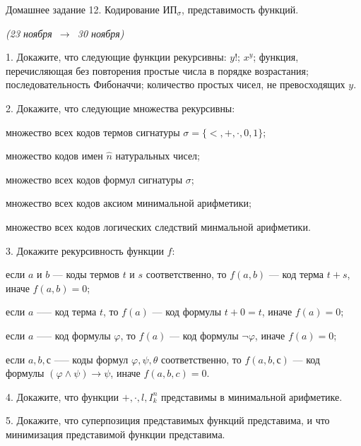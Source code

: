 \documentclass[a4paper,11pt]{article}
\begin{document}
   \newcommand{\enumsep}{\vspace{-2.8mm}
   		\begin{enumerate}[itemsep=0.4mm,leftmargin=2.5mm]}

\begin{center}
	{\Large Домашнее задание 12. Кодирование \(\text{ИП}_{\sigma}\), представимость функций.}

	{\it (23 ноября\ \(\to\)\ 30 ноября)}
\end{center}

1. Докажите, что следующие функции рекурсивны: $y!$; $x^y$; функция, перечисляющая без повторения простые числа в порядке возрастания; последовательность Фибоначчи; количество простых чисел, не превосходящих $y$. 
\medskip

2. Докажите, что следующие множества рекурсивны: 

множество всех кодов термов сигнатуры $\sigma=\{<,+,\cdot,0,1\}$; 

множество кодов имен $\hat{n}$ натуральных чисел; 

множество всех кодов формул сигнатуры $\sigma$;

множество всех кодов аксиом минимальной арифметики;

множество всех кодов логических следствий минмальной арифметики. 
\medskip

3. Докажите рекурсивность функции $f$:

 если $a$ и $b$ — коды термов $t$ и $s$ соответственно, то $f (a, b)$ --- код терма $t + s$, иначе $f (a, b) = 0$;

если $a$ --— код терма $t$, то $f (a)$ --- код формулы $t + 0 = t$, иначе $f (a) = 0$;

если $a$ --— код формулы $\varphi$, то $f (a)$ --- код формулы $\neg\varphi$, иначе $f (a) = 0$;

если $a, b, с$ --— коды формул $\varphi, \psi, \theta$ соответственно, то $f (a, b, с)$ --- код формулы $(\varphi\wedge\psi)\to\psi$, иначе $f (a, b, c) = 0$.
\medskip

4. Докажите, что функции $+,\cdot,l,I^n_k$ представимы в минимальной арифметике.
\medskip

5. Докажите, что суперпозиция представимых функций представима, и что минимизация представимой функции представима.
\end{document}
